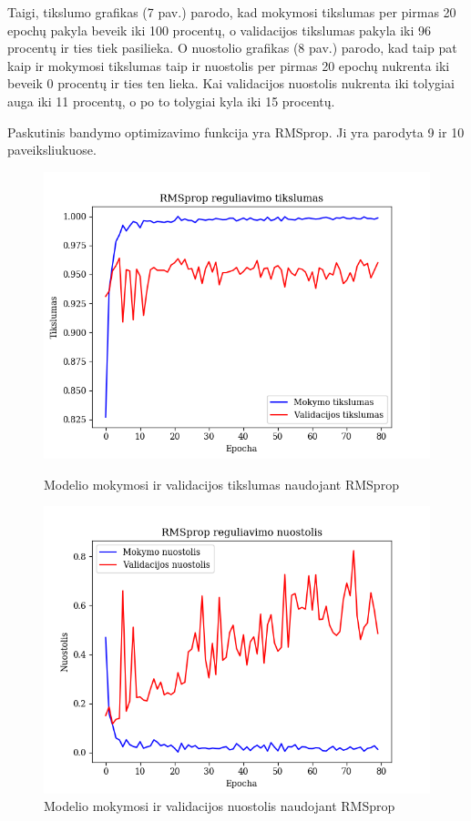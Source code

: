 \documentclass{VUMIFPSkursinis}
\begin{document}
Taigi, tikslumo grafikas (7 pav.) parodo, kad mokymosi tikslumas per pirmas 20 epochų pakyla beveik iki 100 procentų, o validacijos tikslumas pakyla iki 96 procentų ir ties tiek pasilieka.
O nuostolio grafikas (8 pav.) parodo, kad taip pat kaip ir mokymosi tikslumas taip ir nuostolis per pirmas 20 epochų nukrenta iki beveik 0 procentų ir ties ten lieka. Kai validacijos nuostolis 
nukrenta iki tolygiai auga iki 11 procentų, o po to tolygiai kyla iki 15 procentų.

Paskutinis bandymo optimizavimo funkcija yra RMSprop. Ji yra parodyta 9 ir 10 paveiksliukuose.

\begin{figure}[!htbp]
  \centering
  \begin{minipage}[b]{0.49\textwidth}
    \includegraphics[width=\textwidth]{img/FT/RMSprop_acc.png}
    \caption{Modelio mokymosi ir validacijos tikslumas naudojant RMSprop}
  \end{minipage}
  \begin{minipage}[b]{0.49\textwidth}
    \includegraphics[width=\textwidth]{img/FT/RMSprop_loss.png}
    \caption{Modelio mokymosi ir validacijos nuostolis naudojant RMSprop}
  \end{minipage}
\end{figure}
\end{document}
